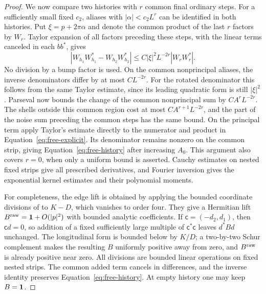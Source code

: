 \begin{proof}
We now compare two histories with $r$ common final ordinary steps.
For a sufficiently small fixed $c_2$, aliases with
$|\alpha|<c_2L^r$ can be identified in both histories.  Put
$\xi=p+2\pi\alpha$ and denote the common product of the last $r$
factors by $W_r$.  Taylor expansion of all factors preceding these
steps, with the linear terms canceled in each $bb^*$, gives
\[
 |W_{h_1}W_{h_1}^*
       -W_{h_2}W_{h_2}^*|
 \le C|\xi|^2L^{-2r}|W_rW_r^*|.
\]
No division by a bump factor is used.  On the common nonprincipal
aliases, the inverse denominators differ by at most $CL^{-2r}$.
For the rotated denominator this follows from the same Taylor
estimate, since its leading quadratic form is still $|\xi|^2$.
Parseval now bounds the change of the common nonprincipal sum by
$CA^rL^{-2r}$.  The shells outside this common region cost at most
$CA^{r+1}L^{-2r}$, and the part of the noise sum preceding the common
steps has the same bound.  On the principal term apply Taylor's
estimate directly to the numerator and product in
Equation~\eqref{eq:free-explicit}.  Its denominator remains nonzero
on the common strip, giving Equation~\eqref{eq:free-history} after
increasing $A_0$.  This argument also covers $r=0$, when only a uniform
bound is asserted.  Cauchy estimates on nested fixed strips give all
prescribed derivatives, and Fourier inversion gives the exponential
kernel estimates and their polynomial moments.

For completeness, the edge lift is obtained by applying the bounded
coordinate divisions of  to $K-D$, which vanishes
to order four.  They give a Hermitian lift
$B^{\rm raw}=\mathbf 1+O(|p|^2)$ with bounded analytic coefficients.
If $\mathsf c=(-d_2,d_1)$, then $\mathsf c d=0$, so addition of a
fixed sufficiently large multiple of $\mathsf c^*\mathsf c$ leaves
$d^*Bd$ unchanged.  The longitudinal form is bounded below by $K/D$;
a two-by-two Schur complement makes the resulting $B$ uniformly
positive away from zero, and $B^{\rm raw}$ is already positive near
zero.  All divisions are bounded linear operations on fixed nested
strips.  The common added term cancels in differences, and the inverse
identity preserves Equation~\eqref{eq:free-history}.  At empty history
one may keep $B=\mathbf 1$.


\end{proof}
